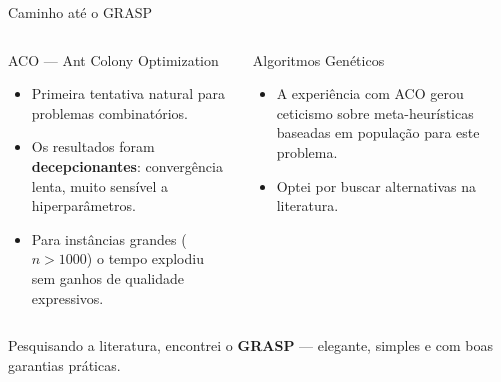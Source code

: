 \documentclass[aspectratio=169]{beamer}
\begin{document}
\begin{frame}{Caminho até o GRASP}

  \begin{columns}[T]
      \begin{block}{ACO — Ant Colony Optimization}
        \begin{itemize}
          \item Primeira tentativa natural para problemas combinatórios.
          \item Os resultados foram \textbf{decepcionantes}: convergência lenta,
                muito sensível a hiperparâmetros.
          \item Para instâncias grandes ($n > 1000$) o tempo explodiu sem ganhos
                de qualidade expressivos.
        \end{itemize}
      \end{block}
      \begin{block}{Algoritmos Genéticos}
        \begin{itemize}
          \item A experiência com ACO gerou ceticismo sobre meta-heurísticas
                baseadas em população para este problema.
          \item Optei por buscar alternativas na literatura.
        \end{itemize}
      \end{block}
  \end{columns}

  \vspace{0.8em}
  \centering
  \large Pesquisando a literatura, encontrei o \textbf{GRASP} ---
  elegante, simples e com boas garantias práticas.

\end{frame}
\end{document}
